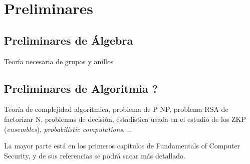 \chapter{Preliminares}\label{ch:preliminares}

\section{Preliminares de Álgebra}

Teoría necesaria de grupos y anillos


\section{Preliminares de Algoritmia ?}

Teoría de complejidad algorítmica, problema de P NP, problema RSA de factorizar N, problemas de decisión, estadística usada en el estudio de los ZKP (\textit{ensembles}), \textit{probabilistic computations}, ...

La mayor parte está en los primeros capítulos de Fundamentals of Computer Security, y de sus referencias se podrá sacar más detallado.